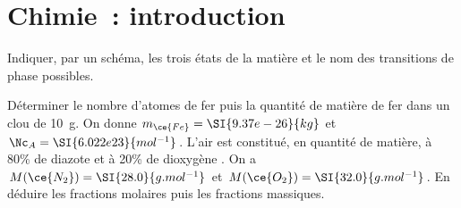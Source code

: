 \documentclass[a4paper, 10pt, final, garamond]{book}
\begin{document}
\setcounter{chapter}{6}

\chapter{Chimie~: introduction}

\begin{enumerate}[label=\sqenumi, leftmargin=10pt]
	Indiquer, par un schéma, les trois états de la matière et le nom des
	transitions de phase possibles.
	\begin{center}
	\end{center}
	Déterminer le nombre d'atomes de fer puis la quantité de matière de
	fer dans un clou de \SI{10}{g}. On donne $m_{\ce{Fe}} = \SI{9.37e-26}{kg}$ et
	$\Nc_A = \SI{6.022e23}{mol^{-1}}$.
	\smallbreak
	\vspace{-15pt}
	L'air est constitué, en quantité de matière, à 80\% de diazote  et
	à 20\% de dioxygène .
	\smallbreak
	On a
	$M(\ce{N_2}) = \SI{28.0}{g.mol^{-1}}$ et
	$M(\ce{O_2}) = \SI{32.0}{g.mol^{-1}}$.
	\smallbreak
	En déduire les fractions molaires puis les fractions massiques.
	\smallbreak
	\begin{isd}
\end{isd}
\end{enumerate}
\end{document}
